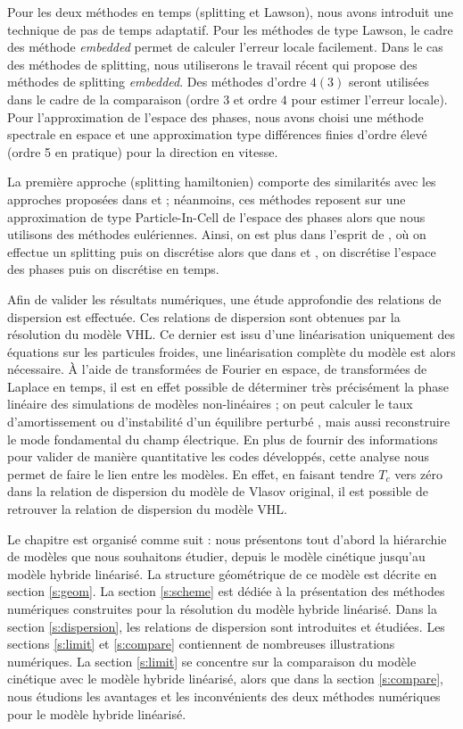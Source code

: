 Pour les deux méthodes en temps (splitting et Lawson), nous avons introduit une technique de pas de temps adaptatif. Pour les méthodes de type Lawson, le cadre des méthode \emph{embedded} \cite{Dormand:1980}\cite{Dormand:1978}  \cite{Balac:2013}\cite{Balac:2014} permet de calculer l'erreur locale facilement. Dans le cas des méthodes de splitting, nous utiliserons le travail récent \cite{Blanes:2019} qui propose des méthodes de splitting \emph{embedded}. Des méthodes d'ordre $4(3)$ seront utilisées dans le cadre de la comparaison (ordre $3$ et ordre $4$ pour estimer l'erreur locale). Pour l'approximation de l'espace des phases, nous avons choisi une méthode spectrale en espace et une approximation type différences finies d'ordre élevé (ordre 5 en pratique) pour la direction en vitesse. 

La première approche (splitting hamiltonien) comporte des similarités avec les approches proposées dans \cite{Kraus:2017} et \cite{Holderied:2019} ; néanmoins, ces méthodes reposent sur une approximation de type Particle-In-Cell de l'espace des phases alors que nous utilisons des méthodes eulériennes. Ainsi, on est plus dans l'esprit de \cite{Crouseilles:2015}, \cite{Li:2020} où on effectue un splitting puis on discrétise alors que dans  \cite{Kraus:2017} et \cite{Holderied:2019}, on discrétise l'espace des phases puis on discrétise en temps.  

Afin de valider les résultats numériques, une étude approfondie des relations de dispersion est effectuée. Ces relations de dispersion sont obtenues par la résolution du modèle VHL. Ce dernier est issu d'une linéarisation uniquement des équations sur les particules froides, une linéarisation complète du modèle est alors nécessaire. À l'aide de transformées de Fourier en espace, de transformées de Laplace en temps, il est en effet possible de déterminer très précisément la phase linéaire des simulations de modèles non-linéaires ; on peut calculer le taux d'amortissement ou d'instabilité d'un équilibre perturbé \cite{Sonnendrucker:2015} \cite{Fried:1961}, mais aussi reconstruire le mode fondamental du champ électrique. En plus de fournir des informations pour valider de manière quantitative les codes développés, cette analyse nous permet de faire le lien entre les modèles. En effet, en faisant tendre $T_c$ vers zéro dans la relation de dispersion du modèle de Vlasov original, il est possible de retrouver la relation de dispersion du modèle VHL. 

Le chapitre est organisé comme suit : nous présentons tout d'abord la hiérarchie de modèles que nous souhaitons étudier, depuis le modèle cinétique jusqu'au modèle hybride linéarisé. La structure géométrique de ce modèle est décrite en section \ref{s:geom}. La section \ref{s:scheme} est dédiée à la présentation des méthodes numériques construites pour la résolution du modèle hybride linéarisé. Dans la section \ref{s:dispersion}, les relations de dispersion sont introduites et étudiées. Les sections \ref{s:limit} et \ref{s:compare} contiennent de nombreuses illustrations numériques. La section \ref{s:limit} se concentre sur la comparaison du modèle cinétique avec le modèle hybride linéarisé, alors que dans la section \ref{s:compare}, nous étudions les avantages et les inconvénients des deux méthodes numériques pour le modèle hybride linéarisé.
